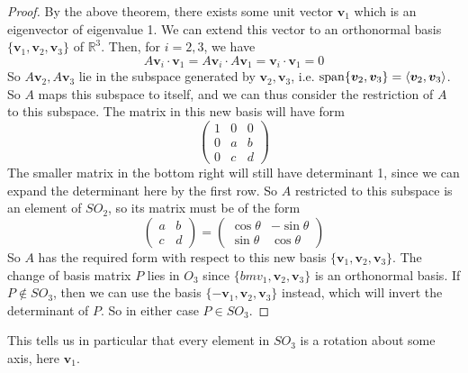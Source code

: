 \documentclass{article}
\begin{document}
	\begin{proof}
		By the above theorem, there exists some unit vector $\bm v_1$ which is an eigenvector of eigenvalue 1. We can extend this vector to an orthonormal basis $\{ \bm v_1, \bm v_2, \bm v_3 \}$ of $\mathbb R^3$. Then, for $i=2,3$, we have
		\[ A\bm v_i \cdot \bm v_1 = A\bm v_i \cdot A\bm v_1 = \bm v_i \cdot \bm v_1 = 0 \]
		So $A\bm v_2, A\bm v_3$ lie in the subspace generated by $\bm v_2, \bm v_3$, i.e. $\operatorname{span} \{ \bm v_2, \bm v_3 \} = \langle \bm v_2, \bm v_3 \rangle$. So $A$ maps this subspace to itself, and we can thus consider the restriction of $A$ to this subspace. The matrix in this new basis will have form
		\[ \begin{pmatrix}
			1 & 0 & 0 \\
			0 & a & b \\
			0 & c & d
		\end{pmatrix} \]
		The smaller matrix in the bottom right will still have determinant 1, since we can expand the determinant here by the first row. So $A$ restricted to this subspace is an element of $SO_2$, so its matrix must be of the form
		\[ \begin{pmatrix}
			a & b \\ c & d
		\end{pmatrix} = \begin{pmatrix}
			\cos \theta & -\sin \theta \\
			\sin \theta & \cos \theta
		\end{pmatrix} \]
		So $A$ has the required form with respect to this new basis $\{ \bm v_1, \bm v_2, \bm v_3 \}$. The change of basis matrix $P$ lies in $O_3$ since $\{ bm v_1, \bm v_2, \bm v_3 \}$ is an orthonormal basis. If $P \notin SO_3$, then we can use the basis $\{ -\bm v_1, \bm v_2, \bm v_3 \}$ instead, which will invert the determinant of $P$. So in either case $P \in SO_3$.
	\end{proof}
	This tells us in particular that every element in $SO_3$ is a rotation about some axis, here $\bm v_1$.
\end{document}
